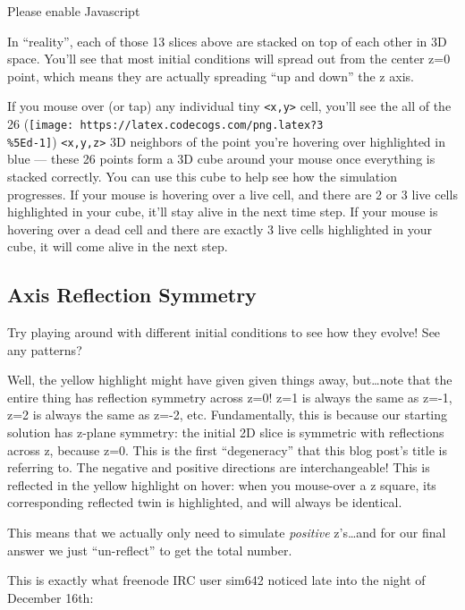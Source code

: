 \documentclass[]{article}
\begin{document}
\leavevmode\hypertarget{gol3D}{}%
Please enable Javascript

In ``reality'', each of those 13 slices above are stacked on top of each other
in 3D space. You'll see that most initial conditions will spread out from the
center z=0 point, which means they are actually spreading ``up and down'' the z
axis.

If you mouse over (or tap) any individual tiny
\texttt{\textless{}x,y\textgreater{}} cell, you'll see the all of the 26
(\texttt{[image: https://latex.codecogs.com/png.latex?3\\\%5Ed-1]})
\texttt{\textless{}x,y,z\textgreater{}} 3D neighbors of the point you're
hovering over highlighted in blue --- these 26 points form a 3D cube around your
mouse once everything is stacked correctly. You can use this cube to help see
how the simulation progresses. If your mouse is hovering over a live cell, and
there are 2 or 3 live cells highlighted in your cube, it'll stay alive in the
next time step. If your mouse is hovering over a dead cell and there are exactly
3 live cells highlighted in your cube, it will come alive in the next step.

\hypertarget{axis-reflection-symmetry}{%
\subsection{Axis Reflection Symmetry}\label{axis-reflection-symmetry}}

Try playing around with different initial conditions to see how they evolve! See
any patterns?

Well, the yellow highlight might have given given things away, but\ldots note
that the entire thing has reflection symmetry across z=0! z=1 is always the same
as z=-1, z=2 is always the same as z=-2, etc. Fundamentally, this is because our
starting solution has z-plane symmetry: the initial 2D slice is symmetric with
reflections across z, because z=0. This is the first ``degeneracy'' that this
blog post's title is referring to. The negative and positive directions are
interchangeable! This is reflected in the yellow highlight on hover: when you
mouse-over a z square, its corresponding reflected twin is highlighted, and will
always be identical.

This means that we actually only need to simulate \emph{positive} z's\ldots and
for our final answer we just ``un-reflect'' to get the total number.

This is exactly what freenode IRC user sim642 noticed late into the night of
December 16th:
\end{document}
